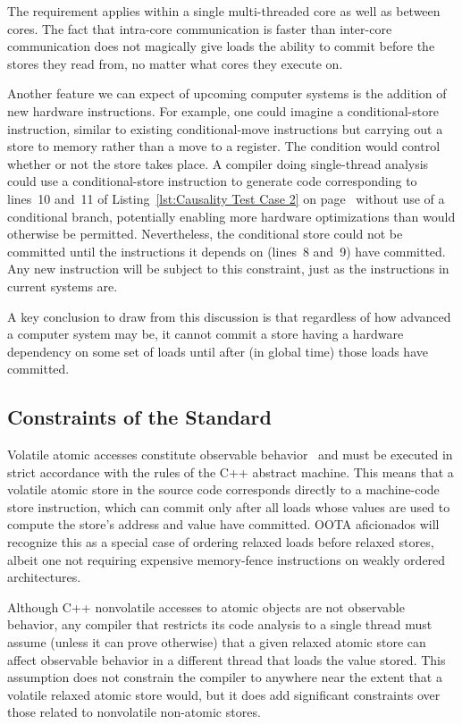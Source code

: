 \documentclass[10]{article}
\begin{document}
The requirement applies within a single
multi-threaded core as well as between cores.
The fact that intra-core communication is faster than inter-core
communication does not magically give loads the ability to commit
before the stores they read from, no matter what cores they execute on.

\medskip

Another feature we can expect of upcoming computer systems is the
addition of new hardware instructions.
For example, one could imagine a conditional-store instruction,
similar to existing conditional-move instructions but carrying out
a store to memory rather than a move to a register.
The condition would control whether or not the store takes place.
A compiler doing single-thread analysis could use a conditional-store
instruction to generate code corresponding to lines~10 and~11 of
Listing~\ref{lst:Causality Test Case 2}
on page~\pageref{lst:Causality Test Case 2}
without use of a conditional branch, potentially
enabling more hardware optimizations than would otherwise be permitted.
Nevertheless, the conditional store could not be committed until
the instructions it depends on (lines~8 and~9) have committed.
Any new instruction will be subject to this constraint,
just as the instructions in current systems are.

A key conclusion to draw from this discussion is that
regardless of how advanced a computer system may be,
it cannot commit a store having a hardware dependency on some
set of loads until after (in global time) those loads have committed.

\subsection{Constraints of the Standard}
\label{sec:Constraints of the Standard}

Volatile atomic accesses constitute observable
behavior~\cite[]{ThomasKoeppe2023N4950} and
must be executed in strict accordance with the rules of the C++ abstract
machine.
This means that a volatile atomic store in the source code
corresponds directly to a machine-code store instruction, which can
commit only after all loads whose values are used to compute the
store's address and value have committed.
OOTA aficionados will recognize this as a special case of ordering
relaxed loads before relaxed stores, albeit one not requiring
expensive memory-fence instructions on weakly ordered architectures.

Although C++ nonvolatile accesses to atomic objects are not observable
behavior, any compiler that restricts its code analysis to a
single thread must assume (unless it can prove otherwise) that a given
relaxed atomic store can affect observable behavior in a different
thread that loads the value stored.
This assumption does not constrain the compiler to anywhere near
the extent that a volatile relaxed atomic store would, but it does add
significant constraints over those related to nonvolatile non-atomic
stores.
\end{document}

